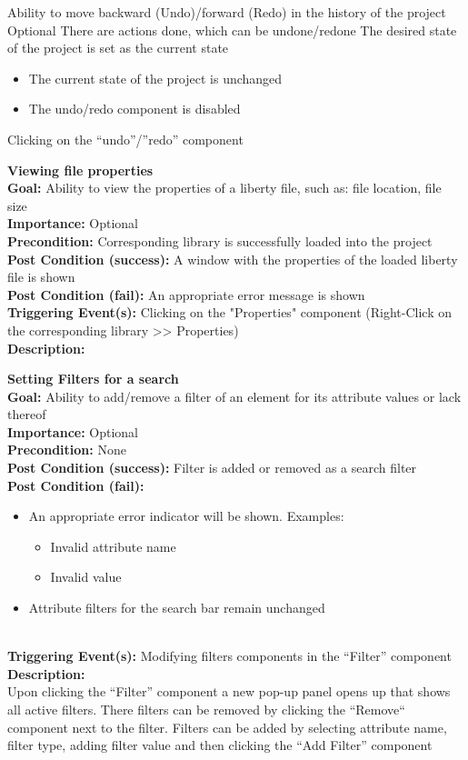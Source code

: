 \documentclass[10pt,a4paper]{report}
\newcommand{\precondition}[1]{
    \textbf{Precondition: } #1 \leavevmode \\
}
\newcommand{\FRDescription}[8]{
    \textbf{#1} \leavevmode \\
    \textbf{Goal: } #2 \leavevmode \\
    \textbf{Importance: } #3 \leavevmode \\
    \precondition{#4}
    \textbf{Post Condition (success): } #5 \leavevmode \\
    \textbf{Post Condition (fail): } #6 \leavevmode \\
    \textbf{Triggering Event(s): } #7 \leavevmode \\
    \textbf{Description: } \leavevmode \\ 
    #8}
\newcommand{\FRODescription}[8]{
    \textbf{#1} \leavevmode \\
    \textbf{Goal: } #2 \leavevmode \\
    \textbf{Importance: } #3 \leavevmode \\
    \precondition{#4}
    \textbf{Post Condition (success): } #5 \leavevmode \\
    \textbf{Post Condition (fail): } #6 \leavevmode \\
    \textbf{Triggering Event(s): } #7 \leavevmode \\
    \textbf{Description: } \leavevmode \\
    #8}
\begin{document}
\begin{FRO}
    {Ability to move backward (Undo)/forward (Redo) in the history of the project}
    {Optional}
    {There are actions done, which can be undone/redone}
    {The desired state of the project is set as the current state}
    {\begin{itemize}
        \item The current state of the project is unchanged
        \item The undo/redo component is disabled
    \end{itemize}}
    {Clicking on the “undo”/”redo” component}
    \item \FRODescription{Viewing file properties}
    {Ability to view the properties of a liberty file, such as: file location, file size}
    {Optional}
    {Corresponding library is successfully loaded into the project}
    {A window with the properties of the loaded liberty file is shown}
    {An appropriate error message is shown}
    {Clicking on the "Properties" component (Right-Click on the corresponding library  >> Properties)}
    \item \FRDescription{Setting Filters for a search}
    {Ability to add/remove a filter of an element for its attribute values or lack thereof}
    {Optional}
    {None}
    {Filter is added or removed as a search filter}
    {\begin{itemize}
        \item An appropriate error indicator will be shown. Examples:
        \begin{itemize}
            \item Invalid attribute name
            \item Invalid value
        \end{itemize}
        \item Attribute filters for the search bar remain unchanged
    \end{itemize}}
    {Modifying filters components in the “Filter” component}
    {Upon clicking the “Filter” component a new pop-up panel opens up that shows all active filters. There filters can be removed by clicking the “Remove“ component next to the filter. Filters can be added by selecting attribute name, filter type, adding filter value and then clicking the “Add Filter” component}

\end{FRO}
\end{document}
